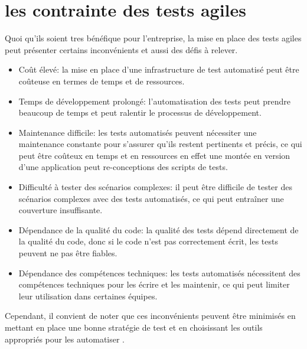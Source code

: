 \section{les contrainte des tests agiles}
Quoi qu'ils soient tres bénéfique pour l'entreprise, la mise en place des tests agiles peut présenter certains inconvénients et aussi des défis à relever.
\begin{itemize}
\item Coût élevé: 
la mise en place d'une infrastructure de test automatisé peut être coûteuse en termes de temps et de ressources.

\item Temps de développement prolongé: 
l'automatisation des tests peut prendre beaucoup de temps et peut ralentir le processus de développement.

\item Maintenance difficile: 
les tests automatisés peuvent nécessiter une maintenance constante pour s'assurer qu'ils restent pertinents et précis, ce qui peut être coûteux en temps et en ressources en effet une montée en version d'une application peut re-conceptions des scripts de tests.

\item Difficulté à tester des scénarios complexes: 
il peut être difficile de tester des scénarios complexes avec des tests automatisés, ce qui peut entraîner une couverture insuffisante.
\item Dépendance de la qualité du code: 
la qualité des tests dépend directement de la qualité du code, donc si le code n'est pas correctement écrit, les tests peuvent ne pas être fiables.
\item Dépendance des compétences techniques: les tests automatisés nécessitent des compétences techniques pour les écrire et les maintenir, ce qui peut limiter leur utilisation dans certaines équipes.

\end{itemize}
Cependant, il convient de noter que ces inconvénients peuvent être minimisés en mettant en place une bonne stratégie de test et en choisissant les outils appropriés pour les automatiser  .



